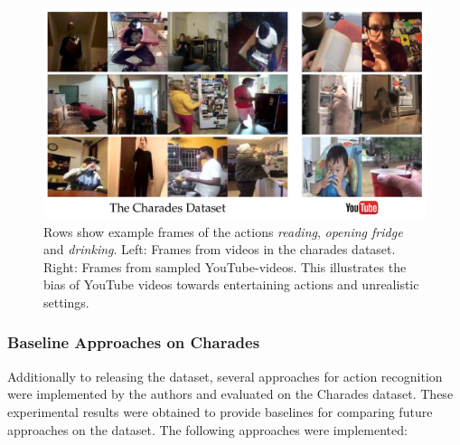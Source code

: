 \begin{figure}[H]
    \centering
    \includegraphics[width=\textwidth]{img_datasets/charades_vs_youtube}
    \caption{Rows show example frames of the actions \textit{reading}, \textit{opening fridge} and \textit{drinking}. Left: Frames from videos in the charades dataset. Right: Frames from sampled YouTube-videos. This illustrates the bias of YouTube videos towards entertaining actions and unrealistic settings. \cite{sigurdsson_hollywood_2016}}
    \label{fig:charades_vs_youtube}
\end{figure}

\subsubsection{Baseline Approaches on Charades}

Additionally to releasing the dataset, several approaches for action recognition were implemented by the authors and evaluated on the Charades dataset.
These experimental results were obtained to provide baselines for comparing future approaches on the dataset.
The following approaches were implemented:

